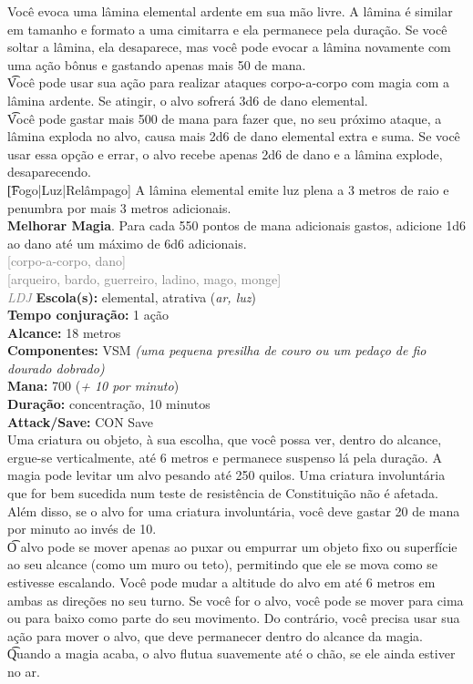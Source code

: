 \documentclass{RPG_Adventure}[2021/10/20]
\begin{document}
{\normalsize Você evoca uma lâmina elemental ardente em sua mão livre. A lâmina é similar em tamanho e formato a uma cimitarra e ela permanece pela duração. Se você soltar a lâmina, ela desaparece, mas você pode evocar a lâmina novamente com uma ação bônus e gastando apenas mais 50 de mana.\\\t Você pode usar sua ação para realizar ataques corpo-a-corpo com magia com a lâmina ardente. Se atingir, o alvo sofrerá 3d6 de dano elemental.\\\t Você pode gastar mais 500 de mana para fazer que, no seu próximo ataque, a lâmina exploda no alvo, causa mais 2d6 de dano elemental extra e suma. Se você usar essa opção e errar, o alvo recebe apenas 2d6 de dano e a lâmina explode, desaparecendo.\\\t [Fogo|Luz|Relâmpago] A lâmina elemental emite luz plena a 3 metros de raio e penumbra por mais 3 metros adicionais.\\\t \textbf{Melhorar Magia}. Para cada 550 pontos de mana adicionais gastos, adicione 1d6 ao dano até um máximo de 6d6 adicionais.\\}
{\scriptsize \textcolor{gray}{[corpo-a-corpo, dano]\\}}
{\scriptsize \textcolor{gray}{[arqueiro, bardo, guerreiro, ladino, mago, monge]\\}}
{\tiny \textcolor{gray}{\textit{LDJ}}}
{\small \t \textbf{Escola(s):} elemental, atrativa (\textit{ar, luz})\\\t \textbf{Tempo conjuração:} 1 ação\\\t \textbf{Alcance:} 18 metros\\\t \textbf{Componentes:} VSM \textit{(uma pequena presilha de couro ou um pedaço de fio dourado dobrado)}\\\t \textbf{Mana:} 700 (\textit{+ 10 por minuto})\\\t \textbf{Duração:} concentração, 10 minutos\\\t \textbf{Attack/Save:} CON Save\\}
{\normalsize Uma criatura ou objeto, à sua escolha, que você possa ver, dentro do alcance, ergue-se verticalmente, até 6 metros e permanece suspenso lá pela duração. A magia pode levitar um alvo pesando até 250 quilos. Uma criatura involuntária que for bem sucedida num teste de resistência de Constituição não é afetada. Além disso, se o alvo for uma criatura involuntária, você deve gastar 20 de mana por minuto ao invés de 10.\\\t O alvo pode se mover apenas ao puxar ou empurrar um objeto fixo ou superfície ao seu alcance (como um muro ou teto), permitindo que ele se mova como se estivesse escalando. Você pode mudar a altitude do alvo em até 6 metros em ambas as direções no seu turno. Se você for o alvo, você pode se mover para cima ou para baixo como parte do seu movimento. Do contrário, você precisa usar sua ação para mover o alvo, que deve permanecer dentro do alcance da magia.  \\\t Quando a magia acaba, o alvo flutua suavemente até o chão, se ele ainda estiver no ar.\\}
\end{document}
